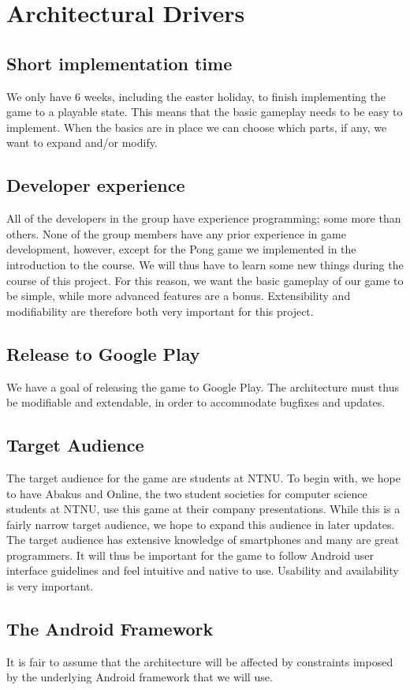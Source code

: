 \section{Architectural Drivers}
\label{sec:architecturaldrivers}

\subsection{Short implementation time}
We only have 6 weeks, including the easter holiday, to finish implementing the
game to a playable state. This means that the basic gameplay needs to be easy
to implement. When the basics are in place we can choose which parts, if any,
we want to expand and/or modify.

\subsection{Developer experience}
All of the developers in the group have experience programming; some more than
others. None of the group members have any prior experience in game
development, however, except for the Pong game we implemented in the
introduction to the course. We will thus have to learn some new things during
the course of this project. For this reason, we want the basic gameplay of our
game to be simple, while more advanced features are a bonus. Extensibility and
modifiability are therefore both very important for this project.

\subsection{Release to Google Play}
We have a goal of releasing the game to Google Play. The architecture must thus
be modifiable and extendable, in order to accommodate bugfixes and updates.

\subsection{Target Audience}
The target audience for the game are students at NTNU\@. To begin with, we hope
to have Abakus and Online, the two student societies for computer science
students at NTNU, use this game at their company presentations. While this is a
fairly narrow target audience, we hope to expand this audience in later updates.
The target audience has extensive knowledge of smartphones and many are great
programmers. It will thus be important for the game to follow Android user
interface guidelines and feel intuitive and native to use. Usability and
availability is very important.

\subsection{The Android Framework}
It is fair to assume that the architecture will be affected by constraints
imposed by the underlying Android framework that we will use.
